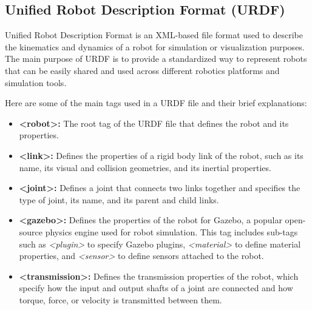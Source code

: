 \documentclass[12pt,oneside]{article}
\begin{document}
\subsection{Unified Robot Description Format (URDF)}\label{urdf}
Unified Robot Description Format is an XML-based file format used to describe the kinematics and dynamics of a robot for simulation or visualization purposes. The main purpose of URDF is to provide a standardized way to represent robots that can be easily shared and used across different robotics platforms and simulation tools.

Here are some of the main tags used in a URDF file and their brief explanations:
\begin{itemize}
\item \textbf{<robot>:} The root tag of the URDF file that defines the robot and its properties.
\item \textbf{<link>:} Defines the properties of a rigid body link of the robot, such as its name, its visual and collision geometries, and its inertial properties.
\item \textbf{<joint>:} Defines a joint that connects two links together and specifies the type of joint, its name, and its parent and child links.
\item \textbf{<gazebo>:} Defines the properties of the robot for Gazebo, a popular open-source physics engine used for robot simulation. This tag includes sub-tags such as \textit{<plugin>} to specify Gazebo plugins, \textit{<material>} to define material properties, and \textit{<sensor>} to define sensors attached to the robot.
\item \textbf{<transmission>:} Defines the transmission properties of the robot, which specify how the input and output shafts of a joint are connected and how torque, force, or velocity is transmitted between them.
\end{itemize}
\end{document}

